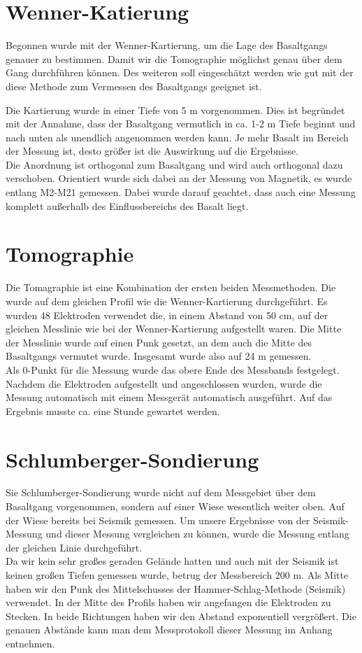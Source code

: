 \section{Wenner-Katierung}

Begonnen wurde mit der Wenner-Kartierung, um die Lage des Basaltgangs genauer zu bestimmen. Damit wir die Tomographie möglichst genau über dem Gang durchführen
können. 
Des weiteren soll eingeschätzt werden wie gut mit der diese Methode zum Vermessen des Basaltgangs geeignet ist.

Die Kartierung wurde in einer Tiefe von 5 m vorgenommen. Dies ist begründet mit der Annahme, dass der Basaltgang vermutlich in ca. 1-2 m Tiefe beginnt und nach unten 
als unendlich angenommen werden kann. Je mehr Basalt im Bereich der Messung ist, desto größer ist die Auswirkung auf die Ergebnisse.\\
Die Anordnung ist orthogonal zum Basaltgang und wird auch orthogonal dazu verschoben. Orientiert wurde sich dabei an der Messung von Magnetik, es wurde 
entlang M2-M21 gemessen. Dabei wurde darauf geachtet, dass auch eine Messung komplett außerhalb 
des Einflussbereichs des Basalt liegt.\\

\section{Tomographie}
Die Tomagraphie ist eine Kombination der ersten beiden Messmethoden. Die wurde auf dem gleichen Profil wie die Wenner-Kartierung durchgeführt.
Es wurden 48 Elektroden verwendet die, in einem Abstand von 50 cm, auf der gleichen Messlinie wie bei der Wenner-Kartierung aufgestellt waren. 
Die Mitte der Messlinie wurde auf einen Punk gesetzt, an dem auch die Mitte des Basaltgangs vermutet wurde. Insgesamt wurde also auf 24 m gemessen.\\
Als 0-Punkt für die Messung wurde das obere Ende des Messbands festgelegt.
Nachdem die Elektroden aufgestellt und angeschlossen wurden, wurde die Messung automatisch mit einem Messgerät automatisch ausgeführt. Auf das Ergebnis musste ca. 
eine Stunde gewartet werden.

\section{Schlumberger-Sondierung}
Sie Schlumberger-Sondierung wurde nicht auf dem Messgebiet über dem Basaltgang vorgenommen, sondern auf einer Wiese wesentlich weiter oben. Auf der Wiese 
bereits bei Seismik gemessen. Um unsere Ergebnisse von der Seismik-Messung und dieser Messung vergleichen zu können, wurde die Messung entlang der gleichen
Linie durchgeführt. \\
Da wir kein sehr großes geraden Gelände hatten und auch mit der Seismik ist keinen großen Tiefen gemessen wurde, betrug der Messbereich 200 m. Als Mitte 
haben wir den Punk des Mittelschusses der Hammer-Schlag-Methode (Seismik) verwendet.
In der Mitte des Profils haben wir angefangen die Elektroden zu Stecken. In beide Richtungen haben wir den Abstand exponentiell vergrößert. Die genauen Abstände kann man dem Messprotokoll dieser Messung im Anhang entnehmen.